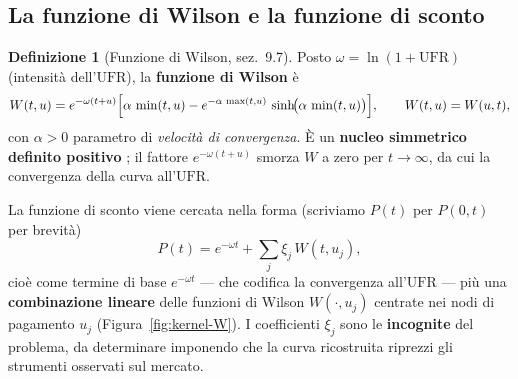 \documentclass[11pt,a4paper]{article}
\theoremstyle{plain}
\theoremstyle{definition}
\newtheorem{definizione}[teorema]{Definizione}
\theoremstyle{remark}
\newcommand{\UFR}{\ensuremath{\mathrm{UFR}}}
\newcommand{\Qmat}{\mathbf{Q}}
\begin{document}
%
%

\subsection{La funzione di Wilson e la funzione di sconto}
\label{sub:kernel-W}

\begin{definizione}[Funzione di Wilson, \cite{eiopa2025} sez.~9.7]
Posto $\omega = \ln(1+\UFR)$ (intensit\`a dell'$\UFR$), la \textbf{funzione di Wilson} \`e
\[
  W(t,u) = e^{-\omega(t+u)}\Bigl[\alpha\,\min(t,u)
           - e^{-\alpha\,\max(t,u)}\,\sinh\!\bigl(\alpha\,\min(t,u)\bigr)\Bigr],
  \qquad W(t,u)=W(u,t),
\]
con $\alpha>0$ parametro di \emph{velocit\`a di convergenza}. \`E un \textbf{nucleo simmetrico
definito positivo} \cite{fasshauer2007,lageras2016}; il fattore $e^{-\omega(t+u)}$ smorza $W$ a zero per
$t\to\infty$, da cui la convergenza della curva all'$\UFR$.
\end{definizione}

La funzione di sconto viene cercata nella forma (scriviamo $P(t)$ per $P(0,t)$ per brevit\`a)
\begin{equation}
  P(t) = e^{-\omega t} + \textstyle\sum_{j} \xi_j\, W(t,u_j),
  \label{eq:sw-P-W}
\end{equation}
cio\`e come termine di base $e^{-\omega t}$ --- che codifica la convergenza all'$\UFR$ --- pi\`u
una \textbf{combinazione lineare} delle funzioni di Wilson $W(\cdot,u_j)$ centrate nei nodi di
pagamento $u_j$ (Figura~\ref{fig:kernel-W}). I coefficienti $\xi_j$ sono le \textbf{incognite}
del problema, da determinare imponendo che la curva ricostruita riprezzi gli strumenti
osservati sul mercato.
\end{document}
